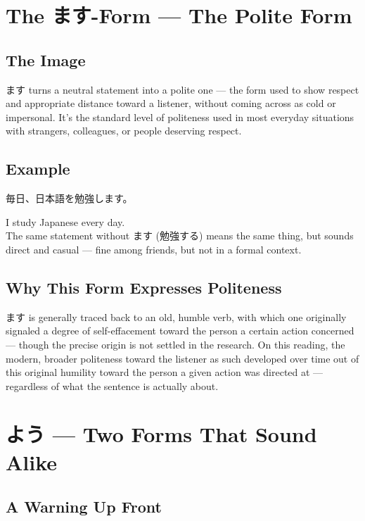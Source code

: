 \documentclass[12pt]{book}
\begin{document}
\chapter{The ます-Form — The Polite Form}

\section*{The Image}

ます turns a neutral statement into a polite one — the form used to show respect and appropriate distance toward a listener, without coming across as cold or impersonal. It's the standard level of politeness used in most everyday situations with strangers, colleagues, or people deserving respect.

\section*{Example}

\par\quad 毎日、日本語を勉強します。\\
\par\quad I study Japanese every day.\\

The same statement without ます (勉強する) means the same thing, but sounds direct and casual — fine among friends, but not in a formal context.

\section*{Why This Form Expresses Politeness}

ます is generally traced back to an old, humble verb, with which one originally signaled a degree of self-effacement toward the person a certain action concerned — though the precise origin is not settled in the research. On this reading, the modern, broader politeness toward the listener as such developed over time out of this original humility toward the person a given action was directed at — regardless of what the sentence is actually about.


\chapter{よう — Two Forms That Sound Alike}

\section*{A Warning Up Front}
\end{document}
